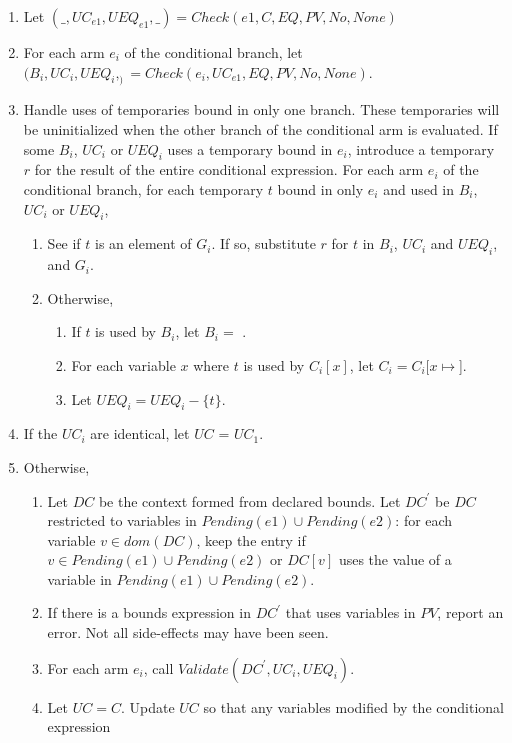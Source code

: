 \begin{enumerate}
\item Let $(\_, \mathit{UC}_{e1}, {UEQ}_{e1}, \_)= Check(e1, C, EQ, PV, No, None)$
\item For each arm $e_i$ of the conditional branch,
        let $(B_i, \mathit{UC}_i, {UEQ}_i, _) = Check(e_i, \mathit{UC}_{e1}, EQ, PV, No, None)$.
\item Handle uses of temporaries bound in only one branch.  These temporaries
will be uninitialized when the other branch of the conditional arm is evaluated.
If some $B_i$, $\mathit{UC}_i$ or ${UEQ}_i$ uses a temporary bound in $e_i$,
introduce a  temporary $r$ for the result of the entire conditional expression.
For each arm $e_i$ of the conditional branch, for each temporary $t$ bound
in only $e_i$ and used in $B_i$, $\mathit{UC}_i$ or ${UEQ}_i$,
\begin{enumerate}
\item See if $t$ is an element of $G_i$. If so, substitute $r$ for $t$ in $B_i$, $\mathit{UC}_i$ and ${UEQ}_i$,
and $G_i$.
\item Otherwise,
\begin{enumerate}
\item If $t$ is used by $B_i$, let $B_i = $ \boundsunknown.
\item For each variable $x$ where $t$ is used by $C_i[x]$, let $C_i = C_i[x \mapsto $\boundsunknown].
\item Let ${UEQ}_i = {UEQ}_i - \{ t \}$.
\end{enumerate}
\end{enumerate}
\item If the $\mathit{UC}_i$ are identical, let $\mathit{UC}$ = $\mathit{UC}_1$.
\item Otherwise,
\begin{enumerate}
\item Let $DC$ be the context formed from declared bounds.
Let $DC^\prime$ be $DC$ restricted to variables in $Pending(e1) \cup Pending(e2)$:
for each variable $v \in dom(DC)$, keep the entry if $v \in Pending(e1) \cup Pending(e2)$
or $DC[v]$ uses the value of a variable in $Pending(e1) \cup Pending(e2)$.
\item If there is a bounds expression in $DC^\prime$ that uses variables in $PV$,
report an error.   Not all side-effects may have been seen.
\item For each arm $e_i$, call $Validate(DC^\prime, \mathit{UC}_i, {UEQ}_i)$.
\item Let $\mathit{UC} = C$.  Update $\mathit{UC}$ so that any variables modified by the conditional expression

\end{enumerate}
\end{enumerate}
